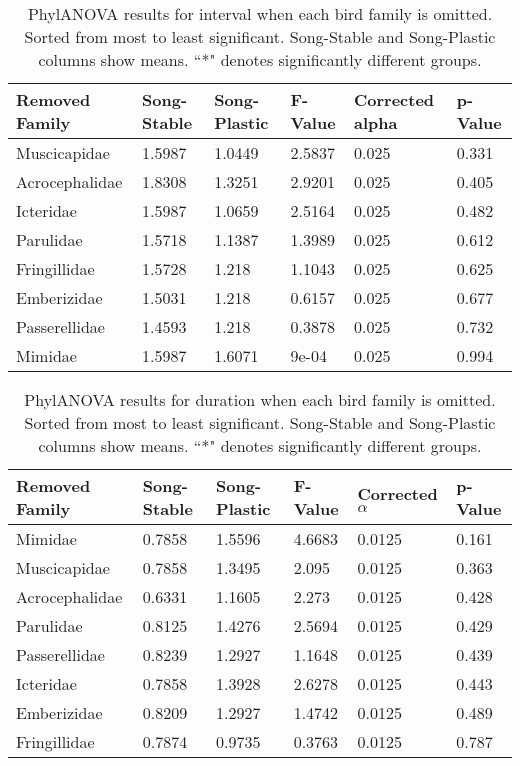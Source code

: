 \documentclass[a4paper,12pt]{article}
\begin{document}
\begin{table}[ht]
\caption{PhylANOVA results for interval when each bird family is omitted.  Sorted from most to least significant.  Song-Stable and Song-Plastic columns show means.  ``*" denotes significantly different groups.}
\centering
\begin{tabular}{llllll}
  \hline
Removed Family & Song-Stable & Song-Plastic & F-Value & Corrected alpha & p-Value \\ 
  \hline
Muscicapidae & 1.5987 & 1.0449 & 2.5837 & 0.025 & 0.331 \\ 
  Acrocephalidae & 1.8308 & 1.3251 & 2.9201 & 0.025 & 0.405 \\ 
  Icteridae & 1.5987 & 1.0659 & 2.5164 & 0.025 & 0.482 \\ 
  Parulidae & 1.5718 & 1.1387 & 1.3989 & 0.025 & 0.612 \\ 
  Fringillidae & 1.5728 & 1.218 & 1.1043 & 0.025 & 0.625 \\ 
  Emberizidae & 1.5031 & 1.218 & 0.6157 & 0.025 & 0.677 \\ 
  Passerellidae & 1.4593 & 1.218 & 0.3878 & 0.025 & 0.732 \\ 
  Mimidae & 1.5987 & 1.6071 & 9e-04 & 0.025 & 0.994 \\ 
   \hline
\end{tabular}
\end{table}

\begin{table}[ht]
\centering
\caption{PhylANOVA results for duration when each bird family is omitted.  Sorted from most to least significant.  Song-Stable and Song-Plastic columns show means.  ``*" denotes significantly different groups.}
\begin{tabular}{llllll}
  \hline
Removed Family & Song-Stable & Song-Plastic & F-Value & Corrected $\alpha$ & p-Value \\ 
  \hline
  Mimidae & 0.7858 & 1.5596 & 4.6683 & 0.0125 & 0.161 \\ 
  Muscicapidae & 0.7858 & 1.3495 & 2.095 & 0.0125 & 0.363 \\ 
  Acrocephalidae & 0.6331 & 1.1605 & 2.273 & 0.0125 & 0.428 \\ 
  Parulidae & 0.8125 & 1.4276 & 2.5694 & 0.0125 & 0.429 \\ 
  Passerellidae & 0.8239 & 1.2927 & 1.1648 & 0.0125 & 0.439 \\ 
  Icteridae & 0.7858 & 1.3928 & 2.6278 & 0.0125 & 0.443 \\ 
  Emberizidae & 0.8209 & 1.2927 & 1.4742 & 0.0125 & 0.489 \\ 
  Fringillidae & 0.7874 & 0.9735 & 0.3763 & 0.0125 & 0.787 \\ 
   \hline
\end{tabular}
\end{table}
\end{document}

